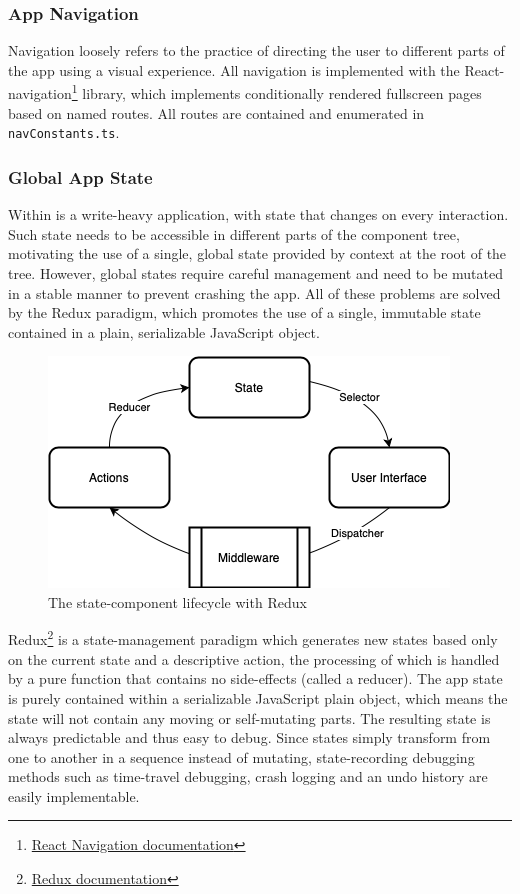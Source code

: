 \subsubsection{App Navigation}
Navigation loosely refers to the practice of directing the user to different parts of the app using a visual experience. All navigation is implemented with the React-navigation\footnote{\href{https://reactnavigation.org}{React Navigation documentation}} library, which implements conditionally rendered fullscreen pages based on named routes. All routes are contained and enumerated in \texttt{navConstants.ts}.

\subsubsection{Global App State}
Within is a write-heavy application, with state that changes on every interaction. Such state needs to be accessible in different parts of the component tree, motivating the use of a single, global state provided by context at the root of the tree. However, global states require careful management and need to be mutated in a stable manner to prevent crashing the app. All of these problems are solved by the Redux paradigm, which promotes the use of a single, immutable state contained in a plain, serializable JavaScript object.

\begin{figure}[h]
    \begin{center}
        \includegraphics[scale=0.55]{images/redux_state.png}
    \end{center}
    \caption{The state-component lifecycle with Redux}
    \label{fig:redux_state}
\end{figure}

Redux\footnote{\href{https://redux.js.org/usage/usage-with-TypeScript}{Redux documentation}} is a state-management paradigm which generates new states based only on the current state and a descriptive action, the processing of which is handled by a pure function that contains no side-effects (called a reducer). The app state is purely contained within a serializable JavaScript plain object, which means the state will not contain any moving or self-mutating parts. The resulting state is always predictable and thus easy to debug. Since states simply transform from one to another in a sequence instead of mutating, state-recording debugging methods such as time-travel debugging, crash logging and an undo history are easily implementable.

